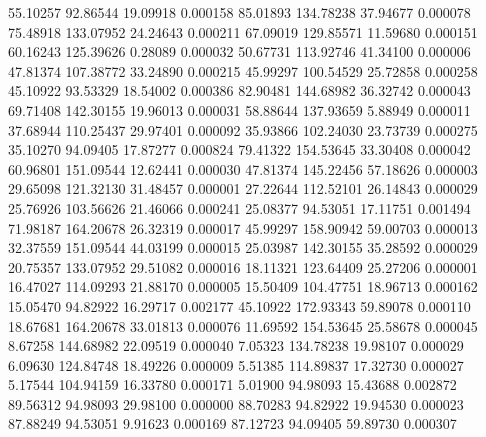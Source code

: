        55.10257       92.86544       19.09918       0.000158
       85.01893      134.78238       37.94677       0.000078
       75.48918      133.07952       24.24643       0.000211
       67.09019      129.85571       11.59680       0.000151
       60.16243      125.39626        0.28089       0.000032
       50.67731      113.92746       41.34100       0.000006
       47.81374      107.38772       33.24890       0.000215
       45.99297      100.54529       25.72858       0.000258
       45.10922       93.53329       18.54002       0.000386
       82.90481      144.68982       36.32742       0.000043
       69.71408      142.30155       19.96013       0.000031
       58.88644      137.93659        5.88949       0.000011
       37.68944      110.25437       29.97401       0.000092
       35.93866      102.24030       23.73739       0.000275
       35.10270       94.09405       17.87277       0.000824
       79.41322      154.53645       33.30408       0.000042
       60.96801      151.09544       12.62441       0.000030
       47.81374      145.22456       57.18626       0.000003
       29.65098      121.32130       31.48457       0.000001
       27.22644      112.52101       26.14843       0.000029
       25.76926      103.56626       21.46066       0.000241
       25.08377       94.53051       17.11751       0.001494
       71.98187      164.20678       26.32319       0.000017
       45.99297      158.90942       59.00703       0.000013
       32.37559      151.09544       44.03199       0.000015
       25.03987      142.30155       35.28592       0.000029
       20.75357      133.07952       29.51082       0.000016
       18.11321      123.64409       25.27206       0.000001
       16.47027      114.09293       21.88170       0.000005
       15.50409      104.47751       18.96713       0.000162
       15.05470       94.82922       16.29717       0.002177
       45.10922      172.93343       59.89078       0.000110
       18.67681      164.20678       33.01813       0.000076
       11.69592      154.53645       25.58678       0.000045
	8.67258      144.68982       22.09519       0.000040
	7.05323      134.78238       19.98107       0.000029
	6.09630      124.84748       18.49226       0.000009
	5.51385      114.89837       17.32730       0.000027
	5.17544      104.94159       16.33780       0.000171
	5.01900       94.98093       15.43688       0.002872
       89.56312       94.98093       29.98100       0.000000
       88.70283       94.82922       19.94530       0.000023
       87.88249       94.53051        9.91623       0.000169
       87.12723       94.09405       59.89730       0.000307
